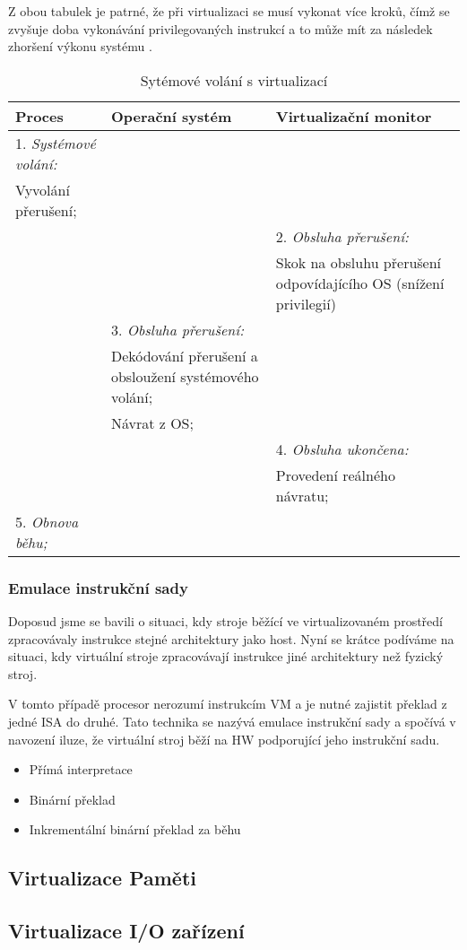 Z obou tabulek je patrné, že při virtualizaci se musí vykonat více kroků, čímž se zvyšuje doba vykonávání privilegovaných instrukcí a to může mít za následek zhoršení výkonu systému \cite{vmm_book}.

\begin{table}
    \centering    
    \begin{tabularx}{\textwidth}{XXX}
    Proces & Operační systém & Virtualizační monitor \\
    \hline
    1. \textit{Systémové volání:} && \\ Vyvolání přerušení; && \\
    && 2. \textit{Obsluha přerušení:} \\ && Skok na obsluhu přerušení odpovídajícího OS (snížení privilegií) \\    
    & 3. \textit{Obsluha přerušení:} & \\ & Dekódování přerušení a obsloužení systémového volání; & \\ & Návrat z OS; & \\
    && 4. \textit{Obsluha ukončena:} \\ && Provedení reálného návratu;\\
    5. \textit{Obnova běhu;} &&\\
    \end{tabularx}

    \caption[Sytémové volání s virtualizací]{Sytémové volání s virtualizací \cite{vmm_book}}
    \label{table:syscall_virt}
\end{table}


\subsubsection{Emulace instrukční sady}
\label{subsubsection:isa_emulation}

Doposud jsme se bavili o situaci, kdy stroje běžící ve virtualizovaném prostředí zpracovávaly instrukce stejné architektury jako host. Nyní se krátce podíváme na situaci, kdy virtuální stroje zpracovávají instrukce
jiné architektury než fyzický stroj.

V tomto případě procesor nerozumí instrukcím VM a je nutné zajistit překlad z jedné ISA do druhé. Tato technika se nazývá emulace instrukční sady a spočívá v navození iluze, že virtuální stroj běží
na HW podporující jeho instrukční sadu. 



\begin{itemize}
 \item Přímá interpretace
 \item Binární překlad
 \item Inkrementální binární překlad za běhu
\end{itemize}


\cite{virt3}



\subsection{Virtualizace Paměti}
\subsection{Virtualizace I/O zařízení}


